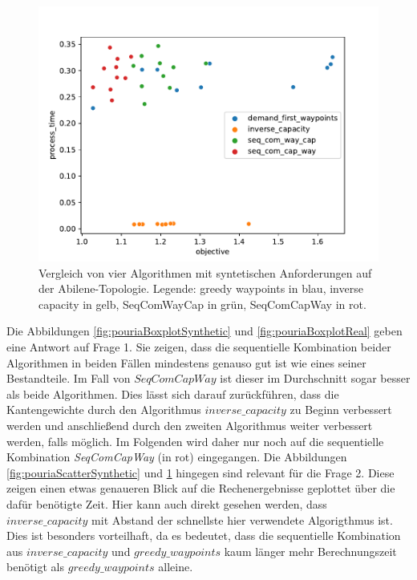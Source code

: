 \documentclass[sigconf, nonacm, review]{acmart}
\begin{document}
\begin{figure}
\centering
\includegraphics[width=\linewidth]{figures/pouria_colored_scatter_plot_results_real_demands.pdf}
\caption{Vergleich von vier Algorithmen mit syntetischen Anforderungen auf der Abilene-Topologie. Legende: greedy waypoints in blau, inverse capacity in gelb, SeqComWayCap in gr\"un, SeqComCapWay in rot.}
\label{fig:pouriaScatterReal}
\end{figure}
Die Abbildungen \ref{fig:pouriaBoxplotSynthetic} und \ref{fig:pouriaBoxplotReal} geben eine Antwort auf Frage 1.
Sie zeigen, 
dass die sequentielle Kombination beider Algorithmen in beiden F\"allen mindestens genauso gut ist wie eines seiner Bestandteile. 
Im Fall von $SeqComCapWay$ ist dieser im Durchschnitt sogar besser als beide Algorithmen.
Dies l\"asst sich darauf zur\"uckf\"uhren, 
dass die Kantengewichte durch den Algorithmus $inverse\_capacity$ zu Beginn verbessert werden 
und anschlie\ss end durch den zweiten Algorithmus weiter verbessert werden, falls m\"oglich.
Im Folgenden wird daher nur noch auf die sequentielle Kombination \emph{SeqComCapWay} (in rot) eingegangen.\newline
Die Abbildungen \ref{fig:pouriaScatterSynthetic} und \ref{fig:pouriaScatterReal} hingegen sind relevant f\"ur die Frage 2. 
Diese zeigen einen etwas genaueren Blick auf die Rechenergebnisse geplottet \"uber die daf\"ur ben\"otigte Zeit.
Hier kann auch direkt gesehen werden, dass $inverse\_capacity$ mit Abstand der schnellste hier verwendete Algorigthmus ist.
Dies ist besonders vorteilhaft, da es bedeutet, 
dass die sequentielle Kombination aus $inverse\_capacity$ und $greedy\_waypoints$ kaum l\"anger mehr Berechnungszeit ben\"otigt als $greedy\_waypoints$ alleine.
\end{document}

